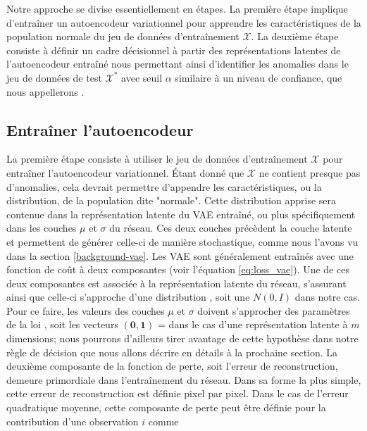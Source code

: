 Notre approche se divise essentiellement en \DIFdelbegin {}\DIFdelend \DIFaddbegin {}\DIFaddend étapes. La première étape implique d'entraîner un autoencodeur variationnel pour apprendre les caractéristiques de la population normale du jeu de données d'entraînement $\mathcal{X}$. La deuxième étape consiste à définir un cadre décisionnel à partir des représentations latentes de l'autoencodeur entraîné nous permettant ainsi d'identifier les anomalies dans le jeu de données de test $\mathcal{X^*}$ avec seuil $\alpha$ similaire à un niveau de confiance, \DIFaddbegin {}\DIFaddend que nous appellerons \DIFdelbegin {}\DIFdelend \DIFaddbegin {}\textbf{}\DIFaddend .

\subsection{Entraîner l'autoencodeur} \label{meth:train-vae}

La première étape consiste à utiliser le jeu de données d'entraînement $\mathcal{X}$ pour entraîner l'autoencodeur variationnel. Étant donné que $\mathcal{X}$ ne contient presque pas d'anomalies, cela devrait permettre d'appendre les caractéristiques, ou la distribution, de la population dite "normale". Cette distribution apprise sera contenue dans la représentation latente du VAE entraîné, ou plus spécifiquement dans les couches $\mu$ et $\sigma$ du réseau. Ces deux couches précèdent la couche latente et permettent de générer celle-ci de manière stochastique, comme nous l'avons vu dans la section \ref{background-vae}. Les VAE sont généralement entraînés avec une fonction de coût à deux composantes (voir l'équation \ref{eq:loss_vae}). Une de ces deux composantes est associée à la représentation latente du réseau, s'assurant ainsi que celle-ci s'approche d'une distribution \DIFdelbegin {}\DIFdelend \DIFaddbegin \textit{}\DIFaddend , soit une $N(0, I)$ dans notre cas. Pour ce faire, les valeurs des couches $\mu$ et $\sigma$ doivent s'approcher des paramètres de la loi \DIFdelbegin {}\DIFdelend \DIFaddbegin \textit{}\DIFaddend , soit les vecteurs $(\mathbf{0}, \mathbf{1})$ = \DIFdelbegin {}\DIFdelend \DIFaddbegin {}\DIFaddend dans le cas d'une représentation latente à $m$ dimensions; nous pourrons d'ailleurs tirer avantage de cette hypothèse \DIFdelbegin {}\DIFdelend \DIFaddbegin \textit{} \DIFaddend dans notre règle de décision que nous allons décrire en détails à la prochaine section. La deuxième composante de la fonction de perte, soit l'erreur de reconstruction, demeure primordiale dans l'entraînement du réseau. Dans sa forme la plus simple, cette erreur de reconstruction est définie pixel par pixel. Dans le cas de l'erreur quadratique moyenne, cette composante de perte peut être définie pour la contribution d'une observation $i$ comme

